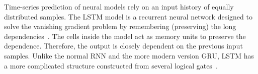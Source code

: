 Time-series prediction of neural models rely on an input history of equally distributed samples.
{The LSTM model is a recurrent neural network designed to solve the vanishing gradient problem by remembering (preserving) the long dependencies~\cite{rasifaghihi_predictive_2020}.}
The cells inside the model act as memory units to preserve the dependence.
Therefore, the output is closely dependent on the previous input samples.
Unlike the normal RNN and the more modern version GRU, LSTM has a more complicated structure constructed from several logical gates~\cite{LSTM_Hochreiter1997}.
{}
